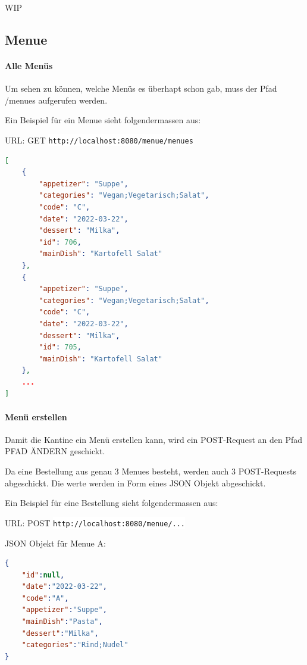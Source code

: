 WIP

\subsection{Menue}

\paragraph{Alle Menüs}

Um sehen zu können, welche Menüs es überhapt schon gab, muss der Pfad /menues aufgerufen werden. 

Ein Beispiel für ein Menue sieht folgendermassen aus:

URL: GET \colorbox{white}{\lstinline[basicstyle=\ttfamily\color{black},language=html]|http://localhost:8080/menue/menues|}


\begin{lstlisting}[language=json,firstnumber=1]
[
    {
        "appetizer": "Suppe",
        "categories": "Vegan;Vegetarisch;Salat",
        "code": "C",
        "date": "2022-03-22",
        "dessert": "Milka",
        "id": 706,
        "mainDish": "Kartofell Salat"
    },
    {
        "appetizer": "Suppe",
        "categories": "Vegan;Vegetarisch;Salat",
        "code": "C",
        "date": "2022-03-22",
        "dessert": "Milka",
        "id": 705,
        "mainDish": "Kartofell Salat"
    },
    ...
]
\end{lstlisting}

\paragraph{Menü erstellen}

Damit die Kantine ein Menü erstellen kann, wird ein POST-Request an den Pfad PFAD ÄNDERN geschickt.

Da eine Bestellung aus genau 3 Menues besteht, werden auch 3 POST-Requests abgeschickt. Die werte werden in Form eines JSON Objekt abgeschickt.

Ein Beispiel für eine Bestellung sieht folgendermassen aus:

URL: POST \colorbox{white}{\lstinline[basicstyle=\ttfamily\color{black},language=html]|http://localhost:8080/menue/...|}


JSON Objekt für Menue A:

\begin{lstlisting}[language=json,firstnumber=1]
{
    "id":null,
    "date":"2022-03-22",
    "code":"A",
    "appetizer":"Suppe",
    "mainDish":"Pasta",
    "dessert":"Milka",
    "categories":"Rind;Nudel"
}
\end{lstlisting}

